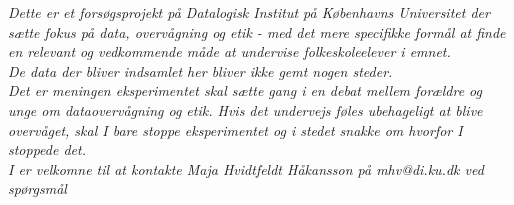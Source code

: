 \documentclass{ucph-handout}
\newcounter{handout}
\newcommand{\Ark}{Ark \#\arabic{handout} -- }
\begin{document}
\begin{exercisebox}[adjusted title=Til forsøgspersonen:]

\textit{Dette er et forsøgsprojekt på Datalogisk Institut på Københavns Universitet der sætte fokus på data, overvågning og etik - med det mere specifikke formål at finde en relevant og vedkommende måde at undervise folkeskoleelever i emnet.} \\

\textit{De data der bliver indsamlet her bliver ikke gemt nogen steder.}\\

\textit{Det er meningen eksperimentet skal sætte gang i en debat mellem forældre og unge om dataovervågning og etik. Hvis det undervejs føles ubehageligt at blive overvåget, skal I bare stoppe eksperimentet og i stedet snakke om hvorfor I stoppede det.}\\ 

\textit{I er velkomne til at kontakte Maja Hvidtfeldt Håkansson på mhv@di.ku.dk ved spørgsmål}\\ 


\end{exercisebox}

\newpage

\renewcommand{\Title}{\Ark frasorterede ark}
\end{document}

